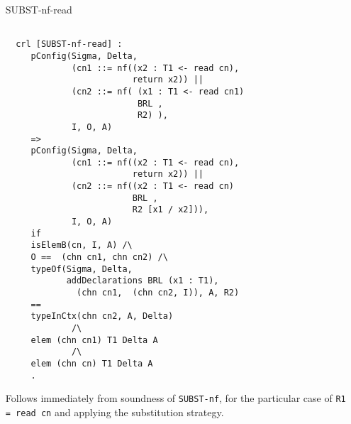 \documentclass{article}
\begin{document}
\begin{itemize}
which is what we get from the right hand side as well by 
applying \verb+bind-bind+.
 
 We now proceed to showing that \verb+SUBST-nf+ is sound. 
 We start with 
    \begin{lstlisting}
   (cn1 ::= R1) || 
             (cn2 ::= nf( (x1 : T1 <- read cn1) 
                          BRL , 
                          R2) )
   \end{lstlisting}
   and we can choose the plain form of 
   the reaction assigned to \verb+cn2+ that starts with
   \verb+x1 : T1 <- read cn1+ and ends with the 
   binds in \verb+BRL+ followed by \verb+R2+. Let \verb+Q+ denote this last
   fragment.
   Since \verb+R1+ is samp-free, we know that the assumptions of
   the \verb+SUBST+ rule hold, using the first statement we proved, 
   and we get 
       \begin{lstlisting}
   (cn1 ::= R1) || 
             (cn2 ::= x1 : T1 <- R1 ; Q )
   \end{lstlisting}                   
   \noindent The normal form of
   \verb+x1 : T1 <- R1 ; Q+
   is precisely
   \begin{lstlisting}
    preNF( (x1 : T1 <~ R1) BRL , R2)
   \end{lstlisting} .

\item[SUBST-nf-read]
 \begin{lstlisting} 
  
  crl [SUBST-nf-read] : 
     pConfig(Sigma, Delta,
             (cn1 ::= nf((x2 : T1 <- read cn), 
                         return x2)) || 
             (cn2 ::= nf( (x1 : T1 <- read cn1) 
                          BRL , 
                          R2) ),
             I, O, A)  
     => 
     pConfig(Sigma, Delta,
             (cn1 ::= nf((x2 : T1 <- read cn), 
                         return x2)) || 
             (cn2 ::= nf((x2 : T1 <- read cn) 
                         BRL , 
                         R2 [x1 / x2])),
             I, O, A) 
     if
     isElemB(cn, I, A) /\
     O ==  (chn cn1, chn cn2) /\ 
     typeOf(Sigma, Delta, 
            addDeclarations BRL (x1 : T1), 
              (chn cn1,  (chn cn2, I)), A, R2) 
     == 
     typeInCtx(chn cn2, A, Delta)
             /\
     elem (chn cn1) T1 Delta A 
             /\
     elem (chn cn) T1 Delta A           
     .   

\end{lstlisting}  

 Follows immediately from soundness of \verb+SUBST-nf+, for the particular
 case of \verb+R1 = read cn+ and applying the substitution strategy.


\end{itemize}
\end{document}
